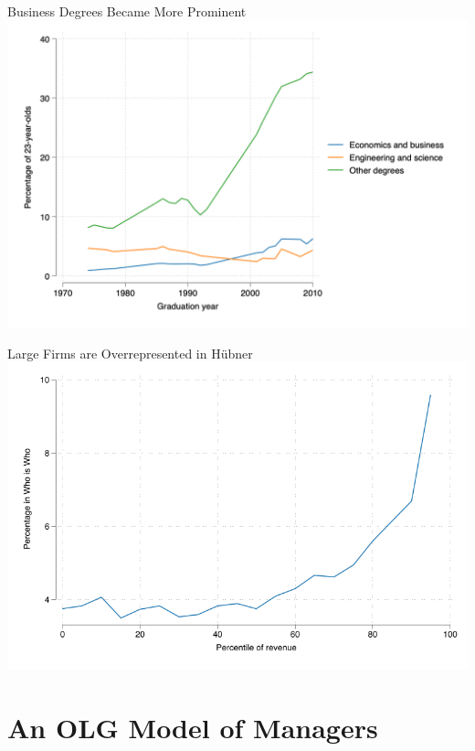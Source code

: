 \documentclass[
  ignorenonframetext,
  aspectratio=1610,
]{beamer}
\begin{document}
\begin{frame}{Business Degrees Became More Prominent}
\protect\hypertarget{business-degrees-became-more-prominent}{}
\includegraphics{fig/school-percentage.png}
\end{frame}

\begin{frame}{Large Firms are Overrepresented in Hübner}
\protect\hypertarget{large-firms-are-overrepresented-in-huxfcbner}{}
\includegraphics{fig/firm-wiw.png}
\end{frame}

\section{An OLG Model of Managers}\label{an-olg-model-of-managers}
\end{document}

